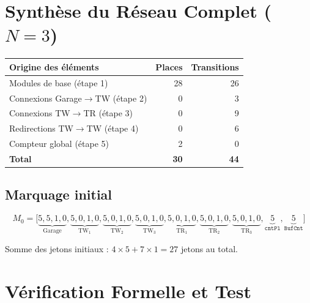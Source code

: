 \documentclass[a4paper,12pt]{article}
\begin{document}
\newpage
\section{Synthèse du Réseau Complet ($N = 3$)}

\begin{center}
\begin{tabular}{lrr}
\toprule
\textbf{Origine des éléments} & \textbf{Places} & \textbf{Transitions} \\
\midrule
Modules de base (étape 1)           & 28 & 26 \\
Connexions Garage$\to$TW (étape 2)  &  0 &  3 \\
Connexions TW$\to$TR (étape 3)      &  0 &  9 \\
Redirections TW$\to$TW (étape 4)    &  0 &  6 \\
Compteur global (étape 5)           &  2 &  0 \\
\midrule
\textbf{Total}                      & \textbf{30} & \textbf{44} \\
\bottomrule
\end{tabular}
\end{center}

\subsection{Marquage initial}

\[
M_0 = \bigl[\underbrace{5, 5, 1, 0}_{\text{Garage}},
             \underbrace{5, 0, 1, 0}_{\text{TW}_1},
             \underbrace{5, 0, 1, 0}_{\text{TW}_2},
             \underbrace{5, 0, 1, 0}_{\text{TW}_3},
             \underbrace{5, 0, 1, 0}_{\text{TR}_1},
             \underbrace{5, 0, 1, 0}_{\text{TR}_2},
             \underbrace{5, 0, 1, 0}_{\text{TR}_3},
             \underbrace{5}_{\texttt{cntPl}},
             \underbrace{5}_{\texttt{BufCnt}}\bigr]
\]

\noindent Somme des jetons initiaux : $4 \times 5 + 7 \times 1 = 27$ jetons au total.

\newpage
\section{Vérification Formelle et Test}
\end{document}
